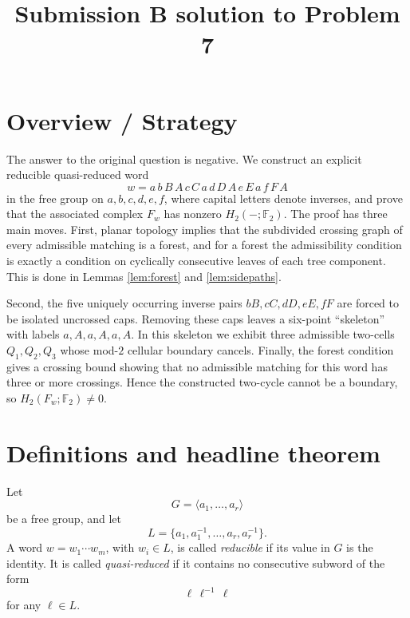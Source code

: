 \documentclass[12pt]{article}
\newcommand{\Ftwo}{\mathbb{F}_2}
\theoremstyle{definition}
\begin{document}
\title{Submission B solution to Problem 7}
\date{}
\maketitle

\section*{Overview / Strategy}

The answer to the original question is negative.  We construct an explicit reducible quasi-reduced word
\[
w=a\,b\,B\,A\,c\,C\,a\,d\,D\,A\,e\,E\,a\,f\,F\,A
\]
in the free group on \(a,b,c,d,e,f\), where capital letters denote inverses, and prove that the associated complex \(F_w\) has nonzero \(H_2(-;\Ftwo)\).  The proof has three main moves.  First, planar topology implies that the subdivided crossing graph of every admissible matching is a forest, and for a forest the admissibility condition is exactly a condition on cyclically consecutive leaves of each tree component.  This is done in Lemmas \ref{lem:forest} and \ref{lem:sidepaths}.

Second, the five uniquely occurring inverse pairs \(bB,cC,dD,eE,fF\) are forced to be isolated uncrossed caps.  Removing these caps leaves a six-point ``skeleton'' with labels \(a,A,a,A,a,A\).  In this skeleton we exhibit three admissible two-cells \(Q_1,Q_2,Q_3\) whose mod-\(2\) cellular boundary cancels.  Finally, the forest condition gives a crossing bound showing that no admissible matching for this word has three or more crossings.  Hence the constructed two-cycle cannot be a boundary, so \(H_2(F_w;\Ftwo)\neq 0\).

\section{Definitions and headline theorem}

Let
\[
G=\langle a_1,\dots,a_r\rangle
\]
be a free group, and let
\[
L=\{a_1,a_1^{-1},\dots,a_r,a_r^{-1}\}.
\]
A word \(w=w_1\cdots w_m\), with \(w_i\in L\), is called \emph{reducible} if its value in \(G\) is the identity.  It is called \emph{quasi-reduced} if it contains no consecutive subword of the form
\[
\ell\,\ell^{-1}\,\ell
\]
for any \(\ell\in L\).
\end{document}
